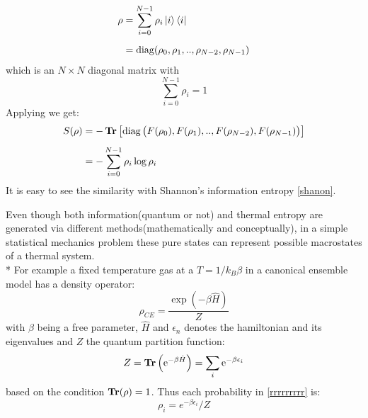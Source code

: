 \begin{itemize}
\begin{align}
\label{asdasdas}
\rho &= \sum_{i=0}^{N-1}\rho_{i}\ket{i}\bra{i} \\[0.5em]
&= \operatorname{diag} (\rho_{0},\rho_{1},..,\rho_{N-2},\rho_{N-1})
\end{align}
which is an $N\times N$ diagonal matrix with \begin{equation}
\sum_{i=0}^{N-1}\rho_{i}=1
\end{equation}
Applying  we get:
\begin{align}
S(\rho) &= -\operatorname{\textup{\textbf{Tr}}} \left[ \operatorname{diag} \big( F(\rho_{0}),F(\rho_{1}),..,F(\rho_{N-2}),F(\rho_{N-1})
 \big) \right] \\[0.5 em] &= -\sum_{i=0}^{N-1}\rho_{i} \log \rho_{i} \label{rrrrrrrrr}
\end{align}
It is easy to see the similarity with Shannon's information entropy \eqref{shanon}.
\par
Even though both information(quantum or not) and thermal entropy are generated via different methods(mathematically and conceptually), in a simple statistical mechanics problem these pure states can represent possible macrostates of a thermal system. 
\\*
For example a fixed temperature gas at a $T=1 / k_{B} \beta$ in a canonical ensemble model has a density operator:
\begin{equation}
\rho_{CE}=\frac{\exp (-\beta \hat{H})}{Z}
\end{equation}
with $\beta$ being a free parameter, $\hat{H}$ and  $\epsilon_{n}$ denotes the hamiltonian and its eigenvalues and $Z$ the quantum partition function:
\begin{equation}
Z=\operatorname{\textup{\textbf{Tr}}}\left(\mathrm{e}^{-\beta \hat{H}}\right)=\sum_{i} \mathrm{e}^{-\beta \epsilon_{i}}
\end{equation}
based on the condition $\operatorname{\textup{\textbf{Tr}}}(\rho)=1$. Thus each probability in \eqref{rrrrrrrrr} is:
\begin{equation}
\rho_{i}= e^{-\beta \epsilon_{i}}/Z
\end{equation}
\end{itemize}
